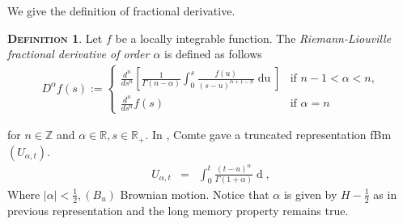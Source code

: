 \documentclass[a4paper, twoside, 11pt]{article}
\theoremstyle{definition}
\newtheorem{definition}{\scshape Definition}[section]
\begin{document}
We give the definition of fractional derivative.
\begin{definition}
  Let $f$ be a locally integrable function. The \emph{Riemann-Liouville fractional derivative of order $\alpha$} is defined as follows
\begin{eqnarray}
  D^\alpha f(s) := \begin{cases} \frac{d^n}{ds^n}[\frac{1}{\Gamma(n-\alpha)}\int_0^s \frac{f(u)}{(s-u)^{\alpha + 1 - n}}\mathop{du}] &\mbox{if } n-1 < \alpha < n,\\
	\frac{d^n}{ds^n} f(s) & \mbox{if } \alpha=n
  \end{cases}
  \label{sec:frader}
\end{eqnarray}
\end{definition}
for $n \in \mathbb{Z}$ and $\alpha \in \mathbb{R}, s \in \mathbb{R}_+ $.
In \cite{comte}, Comte gave a truncated representation fBm $(U_{\alpha,t})$.
\begin{eqnarray}
  U_{\alpha,t} &=& \int_0^t \frac{(t-u)^\alpha}{\Gamma(1+\alpha)}\mathop{dB_u}, 
  \label{<sec:cc1>}
\end{eqnarray}
Where $|\alpha| < \frac{1}{2}, (B_u)$ Brownian motion. Notice that $\alpha$ is given by $H-\frac{1}{2}$ as in previous representation and the long memory property remains true.
\end{document}
